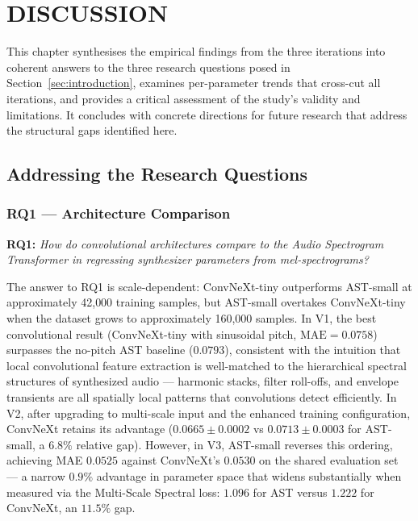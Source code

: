 
\section{DISCUSSION}
\label{sec:discussion}

\noindent
This chapter synthesises the empirical findings from the three iterations into coherent answers to the three research questions posed in Section~\ref{sec:introduction}, examines per-parameter trends that cross-cut all iterations, and provides a critical assessment of the study's validity and limitations. It concludes with concrete directions for future research that address the structural gaps identified here.

\subsection{Addressing the Research Questions}

\subsubsection{RQ1 — Architecture Comparison}

\noindent
\textbf{RQ1:} \textit{How do convolutional architectures compare to the Audio Spectrogram Transformer in regressing synthesizer parameters from mel-spectrograms?}

\noindent \newline
The answer to RQ1 is scale-dependent: ConvNeXt-tiny outperforms AST-small at approximately 42{,}000 training samples, but AST-small overtakes ConvNeXt-tiny when the dataset grows to approximately 160{,}000 samples. In V1, the best convolutional result (ConvNeXt-tiny with sinusoidal pitch, $\text{MAE} = 0.0758$) surpasses the no-pitch AST baseline ($0.0793$), consistent with the intuition that local convolutional feature extraction is well-matched to the hierarchical spectral structures of synthesized audio — harmonic stacks, filter roll-offs, and envelope transients are all spatially local patterns that convolutions detect efficiently. In V2, after upgrading to multi-scale input and the enhanced training configuration, ConvNeXt retains its advantage ($0.0665 \pm 0.0002$ vs $0.0713 \pm 0.0003$ for AST-small, a $6.8\%$ relative gap). However, in V3, AST-small reverses this ordering, achieving MAE $0.0525$ against ConvNeXt's $0.0530$ on the shared evaluation set — a narrow $0.9\%$ advantage in parameter space that widens substantially when measured via the Multi-Scale Spectral loss: $1.096$ for AST versus $1.222$ for ConvNeXt, an $11.5\%$ gap.

